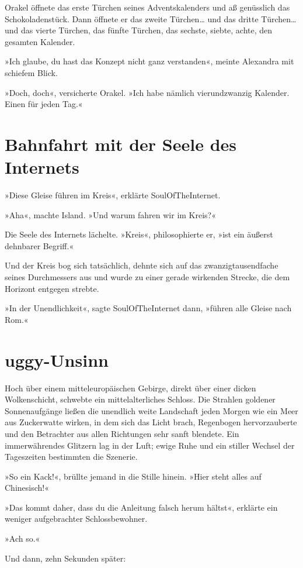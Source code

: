 Orakel öffnete das erste Türchen seines Adventskalenders und aß genüsslich das Schokoladenstück. Dann öffnete er das zweite Türchen… und das dritte Türchen… und das vierte Türchen, das fünfte Türchen, das sechste, siebte, achte, den gesamten Kalender.

»Ich glaube, du hast das Konzept nicht ganz verstanden«, meinte Alexandra mit schiefem Blick.

»Doch, doch«, versicherte Orakel. »Ich habe nämlich vierundzwanzig Kalender. Einen für jeden Tag.«


\section{Bahnfahrt mit der Seele des Internets}

»Diese Gleise führen im Kreis«, erklärte SoulOfTheInternet.

»Aha«, machte Island. »Und warum fahren wir im Kreis?«

Die Seele des Internets lächelte. »Kreis«, philosophierte er, »ist ein äußerst dehnbarer Begriff.«

Und der Kreis bog sich tatsächlich, dehnte sich auf das zwanzigtausendfache seines Durchmessers aus und wurde zu einer gerade wirkenden Strecke, die dem Horizont entgegen strebte.

»In der Unendlichkeit«, sagte SoulOfTheInternet dann, »führen alle Gleise nach Rom.«


\section{uggy-Unsinn}

Hoch über einem mitteleuropäischen Gebirge, direkt über einer dicken Wolkenschicht, schwebte ein mittelalterliches Schloss. Die Strahlen goldener Sonnenaufgänge ließen die unendlich weite Landschaft jeden Morgen wie ein Meer aus Zuckerwatte wirken, in dem sich das Licht brach, Regenbogen hervorzauberte und den Betrachter aus allen Richtungen sehr sanft blendete. Ein immerwährendes Glitzern lag in der Luft; ewige Ruhe und ein stiller Wechsel der Tageszeiten bestimmten die Szenerie.

»So ein Kack!«, brüllte jemand in die Stille hinein. »Hier steht alles auf Chinesisch!«

»Das kommt daher, dass du die Anleitung falsch herum hältst«, erklärte ein weniger aufgebrachter Schlossbewohner.

»Ach so.«

Und dann, zehn Sekunden später:


